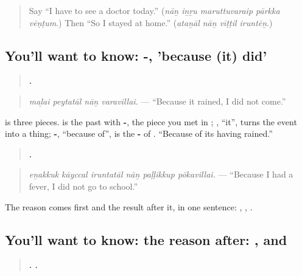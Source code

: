 \label{lesson:TA-C287-vantatal}



\begin{quote}
Say \textquotedblleft{}I have to see a doctor today.\textquotedblright{} (\emph{nāṉ iṉṟu maruttuvaraip pārkka vēṇṭum}.) Then \textquotedblleft{}So I stayed at home.\textquotedblright{} (\emph{ataṉāl nāṉ vīṭṭil iruntēṉ}.)
\end{quote}

\subsection*{You'll want to know: -, 'because (it) did'}
\begin{quote}
\textbf{   .}
\end{quote}

\begin{quote}
\emph{maḻai peytatāl nāṉ varavillai.} — \textquotedblleft{}Because it rained, I did not come.\textquotedblright{}
\end{quote}

\textbf{} is three pieces. \textbf{} is the past with \textbf{-}, the piece you met in \textbf{ }; \textbf{}, \textquotedblleft{}it\textquotedblright{}, turns the event into a thing; \textbf{-}, \textquotedblleft{}because of\textquotedblright{}, is the \textbf{-} of \textbf{}. \textquotedblleft{}Because of its having rained.\textquotedblright{}

\begin{quote}
\textbf{     .}
\end{quote}

\begin{quote}
\emph{eṉakkuk kāyccal iruntatāl nāṉ paḷḷikkup pōkavillai.} — \textquotedblleft{}Because I had a fever, I did not go to school.\textquotedblright{}
\end{quote}

The reason comes first and the result after it, in one sentence: \textbf{}, \textbf{}, \textbf{}.

\subsection*{You'll want to know: the reason after: , and }
\begin{quote}
\textbf{ .   .}
\end{quote}

